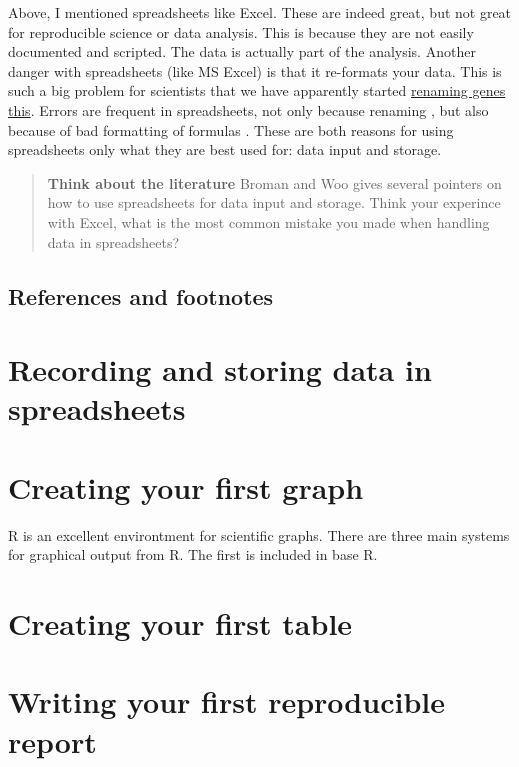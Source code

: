 \documentclass[
]{article}
\begin{document}
Above, I mentioned spreadsheets like Excel. These are indeed great, but not great for reproducible science or data analysis. This is because they are not easily documented and scripted. The data is actually part of the analysis. Another danger with spreadsheets (like MS Excel) is that it re-formats your data. This is such a big problem for scientists that we have apparently started \href{https://www.theverge.com/2020/8/6/21355674/human-genes-rename-microsoft-excel-misreading-dates}{renaming genes this}. Errors are frequent in spreadsheets, not only because renaming \citep{RN2927}, but also because of bad formatting of formulas \citep{RN2928}. These are both reasons for using spreadsheets only what they are best used for: data input and storage.

\begin{quote}
\textbf{Think about the literature}
Broman and Woo\citep{RN2391} gives several pointers on how to use spreadsheets for data input and storage. Think your experince with Excel, what is the most common mistake you made when handling data in spreadsheets?
\end{quote}

\hypertarget{references-and-footnotes}{%
\subsection{References and footnotes}\label{references-and-footnotes}}

\hypertarget{recording-and-storing-data-in-spreadsheets}{%
\section{Recording and storing data in spreadsheets}\label{recording-and-storing-data-in-spreadsheets}}

\hypertarget{creating-your-first-graph}{%
\section{Creating your first graph}\label{creating-your-first-graph}}

R is an excellent environtment for scientific graphs. There are three main systems for graphical output from R. The first is included in base R.

\hypertarget{creating-your-first-table}{%
\section{Creating your first table}\label{creating-your-first-table}}

\hypertarget{writing-your-first-reproducible-report}{%
\section{Writing your first reproducible report}\label{writing-your-first-reproducible-report}}

  
\end{document}

